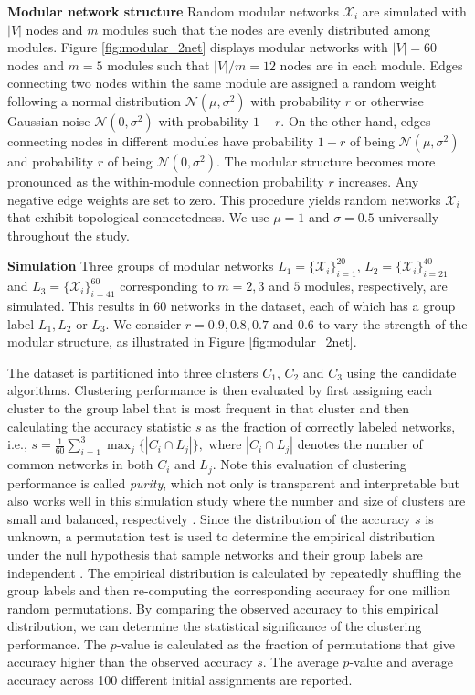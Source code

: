 \documentclass{article} %
\begin{document}
\textbf{Modular network structure}
Random modular networks $\mathcal{X}_i$ are simulated with $|V|$ nodes and $m$ modules such that the nodes are evenly distributed among modules. Figure \ref{fig:modular_2net} displays modular networks with $|V|=60$ nodes and $m=5$ modules such that $|V|/m=12$ nodes are in each module.
Edges connecting two nodes within the same module are assigned a random weight following a normal distribution $\mathcal{N}(\mu,\sigma^2)$ with probability $r$ or otherwise Gaussian noise $\mathcal{N}(0,\sigma^2)$ with probability $1-r$.
On the other hand, edges connecting nodes in different modules have probability $1-r$ of being $\mathcal{N}(\mu,\sigma^2)$ and probability $r$ of being $\mathcal{N}(0,\sigma^2)$. The modular structure becomes more pronounced as the within-module connection probability $r$ increases. Any negative edge weights are set to zero. This procedure yields random networks $\mathcal{X}_i$ that exhibit topological connectedness.
We use $\mu=1$ and $\sigma=0.5$ universally throughout the study.

\textbf{Simulation}
Three groups of modular networks $L_1 = \{\mathcal{X}_i\}_{i=1}^{20}$, $L_2 = \{\mathcal{X}_i\}_{i=21}^{40}$ and $L_3 = \{\mathcal{X}_i\}_{i=41}^{60}$ corresponding to $m = 2, 3$ and $5$ modules, respectively, are simulated. This results in 60 networks in the dataset, each of which has a group label $L_1, L_2$ or $L_3$.
We consider $r = 0.9,0.8,0.7$ and $0.6$ to vary the strength of the modular structure, as illustrated in Figure \ref{fig:modular_2net}.

The dataset is partitioned into three clusters $C_1$, $C_2$ and $C_3$ using the candidate algorithms.
Clustering performance is then evaluated by first assigning each cluster to the group label that is most frequent in that cluster and then calculating the accuracy statistic $s$ as the fraction of correctly labeled networks, i.e.,
$ s = \frac{1}{60} \sum_{i=1}^3 \max_j \{|C_i \cap L_j|\}, $
where $|C_i \cap L_j|$ denotes the number of common networks in both $C_i$ and $L_j$. 
Note this evaluation of clustering performance is called {\em purity}, which not only is transparent and interpretable but also works well in this simulation study where the number and size of clusters are small and balanced, respectively \citep{manning2008introduction}.
Since the distribution of the accuracy $s$ is unknown, a permutation test is used to determine the empirical distribution under the null hypothesis that sample networks and their group labels are independent \citep{ojala2010permutation}. The empirical distribution is calculated by repeatedly shuffling the group labels and then re-computing the corresponding accuracy for one million random permutations. 
By comparing the observed accuracy to this empirical distribution, we can determine the statistical significance of the clustering performance. 
The $p$-value is calculated as the fraction of permutations that give accuracy higher than the observed accuracy $s$.
The average $p$-value and average accuracy across 100 different initial assignments are reported.
\end{document}
